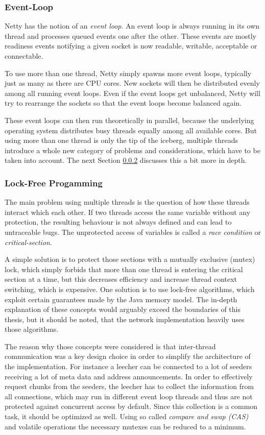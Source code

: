 \subsubsection{Event-Loop}
\label{module:core:conc:eventloop}
Netty has the notion of an \emph{event loop}. An event loop is always running in its own thread and processes queued events one after the other. These events are mostly readiness events notifying a given socket is now readable, writable, acceptable or connectable.

To use more than one thread, Netty simply spawns more event loops, typically just as many as there are CPU cores. New sockets will then be distributed evenly among all running event loops. Even if the event loops get unbalanced, Netty will try to rearrange the sockets so that the event loops become balanced again.

These event loops can then run theoretically in parallel, because the underlying operating system distributes busy threads equally among all available cores. But using more than one thread is only the tip of the iceberg, multiple threads introduce a whole new category of problems and considerations, which have to be taken into account. The next Section \ref{module:core:conc:lockfree} discusses this a bit more in depth.


\subsubsection{Lock-Free Progamming}
\label{module:core:conc:lockfree}
The main problem using multiple threads is the question of how these threads interact which each other. If two threads access the same variable without any protection, the resulting behaviour is not always defined and can lead to untraceable bugs. The unprotected access of variables is called a \emph{race condition} or \emph{critical-section}.

A simple solution is to protect those sections with a mutually exclusive (mutex) lock, which simply forbids that more than one thread is entering the critical section at a time, but this decreases efficiency and increase thread context switching, which is expensive. One solution is to use lock-free algorithms, which exploit certain guarantees made by the Java memory model. The in-depth explanation of these concepts would arguably exceed the boundaries of this thesis, but it should be noted, that the network implementation heavily uses those algorithms.

The reason why those concepts were considered is that inter-thread communication was a key design choice in order to simplify the architecture of the implementation. For instance a leecher can be connected to a lot of seeders receiving a lot of meta data and address announcements. In order to effectively request chunks from the seeders, the leecher has to collect the information from all connections, which may run in different event loop threads and thus are not protected against concurrent access by default. Since this collection is a common task, it should be optimized as well. Using so called \emph{compare and swap (CAS)} and volatile operations the necessary mutexes can be reduced to a minimum. 

